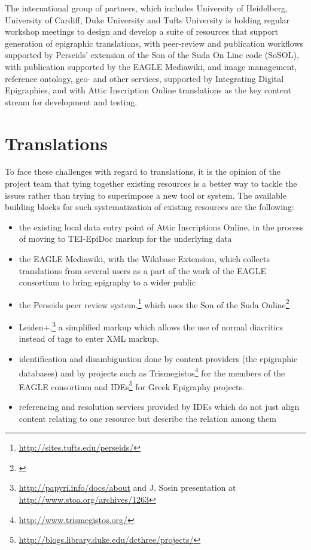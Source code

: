 \documentclass[amsthm,ebook]{saparticle}
\begin{document}
The international group of partners, which includes University of Heidelberg, University of Cardiff, Duke University and Tufts University is holding regular workshop meetings to design and  develop a suite of resources that support generation of epigraphic translations, with peer-review and publication workflows supported by Perseids’ extension of the Son of the Suda On Line code (SoSOL), with publication supported by the EAGLE Mediawiki, and image management, reference ontology, geo- and other services, supported by Integrating Digital Epigraphies, and with Attic Inscription Online translations as the key content stream for development and testing.


\section{Translations}
\noindent To face these challenges with regard to translations, it is the opinion of the project team that tying together existing resources is a better way to tackle the issues rather than trying to superimpose a new tool or system. The available building blocks for such systematization of existing resources are the following:

\begin{itemize}
\item the existing local data entry point of Attic Inscriptions Online, in the process of moving to TEI-EpiDoc markup for the underlying data
\item the EAGLE Mediawiki, with the Wikibase Extension, which collects translations from several users as a part of the work of the EAGLE consortium to bring epigraphy to a wider public 
\item the Perseids peer review system,\footnote{\url{http://sites.tufts.edu/perseids/}} which uses the Son of the Suda Online\footnote{\citet{Baumann2013}}
\item Leiden+,\footnote{\url{http://papyri.info/docs/about} and J. Sosin presentation at \url{http://www.stoa.org/archives/1263}} a simplified markup which allows the use of normal diacritics instead of tags to enter XML markup. 
\item identification and disambiguation done by content providers (the epigraphic databases) and by projects such as Trismegistos\footnote{\url{http://www.trismegistos.org/}} for the members of the EAGLE consortium and IDEs\footnote{\url{http://blogs.library.duke.edu/dcthree/projects/}} for Greek Epigraphy projects.
\item referencing and resolution services provided by IDEs which do not just align content relating to one resource but describe the relation among them
\end{itemize}
\end{document}
